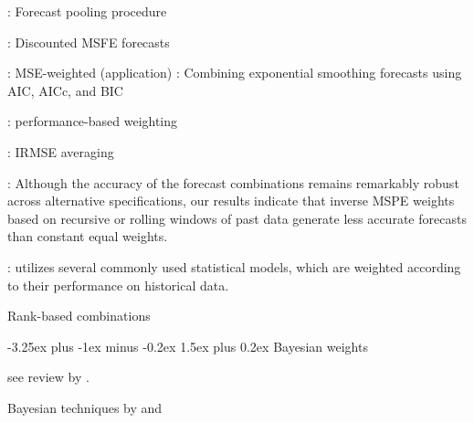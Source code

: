 \documentclass[11pt]{article}
\makeatletter
\renewcommand{\paragraph}{\@startsection{paragraph}{4}{0ex}%
   {-3.25ex plus -1ex minus -0.2ex}%
   {1.5ex plus 0.2ex}%
   {\normalfont\normalsize\bfseries}}
\makeatother
\begin{document}
\cite{Stock1998-np}: Forecast pooling procedure

\cite{Stock2004-rq}: Discounted MSFE forecasts

\cite{Clark2010-jx}: MSE-weighted (application)
\cite{Kolassa2011-ai}: Combining exponential smoothing forecasts using AIC, AICc, and BIC

\cite{Genre2013-ut}: performance-based weighting

\cite{Nowotarski2014-ev}: IRMSE averaging 

\cite{Baumeister2015-ft}: Although the accuracy of the forecast combinations remains remarkably robust across alternative specifications, our results indicate that inverse MSPE weights based on recursive or rolling windows of past data generate less accurate forecasts than constant equal weights.

\cite{Pawlikowski2020-hm}: utilizes several commonly used statistical models, which are weighted according to their performance on historical data.

Rank-based combinations
 

\paragraph{Bayesian weights}

see review by \cite{Cheng2015-tp}.

Bayesian techniques by \cite{Bunn1975-mg} and \cite{Clemen1993-ey}




\end{document}
